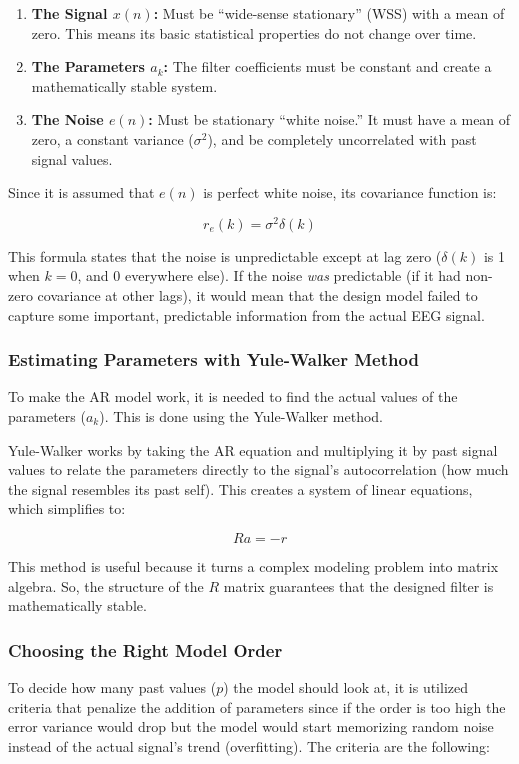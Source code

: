 \documentclass[11pt,a4paper]{article}
\begin{document}
\begin{enumerate}
    \item \textbf{The Signal $x(n)$:} Must be ``wide-sense stationary'' (WSS) with a mean of zero. This means its basic statistical properties do not change over time.

    \item \textbf{The Parameters $a_k$:} The filter coefficients must be constant and create a mathematically stable system.

    \item \textbf{The Noise $e(n)$:} Must be stationary ``white noise.'' It must have a mean of zero, a constant variance ($\sigma^2$), and be completely uncorrelated with past signal values.
\end{enumerate}

Since it is assumed that $e(n)$ is perfect white noise, its covariance function is:

\[
r_e(k) = \sigma^2 \delta(k)
\]

This formula states that the noise is unpredictable except at lag zero ($\delta(k)$ is 1 when $k = 0$, and 0 everywhere else). If the noise \emph{was} predictable (if it had non-zero covariance at other lags), it would mean that the design model failed to capture some important, predictable information from the actual EEG signal.

\subsubsection{Estimating Parameters with Yule-Walker Method}

To make the AR model work, it is needed to find the actual values of the parameters ($a_k$). This is done using the Yule-Walker method.

Yule-Walker works by taking the AR equation and multiplying it by past signal values to relate the parameters directly to the signal's autocorrelation (how much the signal resembles its past self). This creates a system of linear equations, which simplifies to:

\[
R a = -r
\]

This method is useful because it turns a complex modeling problem into matrix algebra. So, the structure of the $R$ matrix guarantees that the designed filter is mathematically stable.

\subsubsection{Choosing the Right Model Order}
To decide how many past values ($p$) the model should look at, it is utilized criteria that penalize the addition of parameters since if the order is too high the error variance would drop but the model would start memorizing random noise instead of the actual signal's trend (overfitting). The criteria are the following:
\end{document}
